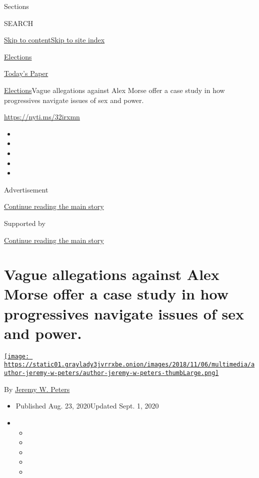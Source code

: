 Sections

SEARCH

\protect\hyperlink{site-content}{Skip to
content}\protect\hyperlink{site-index}{Skip to site index}

\href{https://www.nytimes3xbfgragh.onion/news-event/2020-election}{Elections}

\href{https://myaccount.nytimes3xbfgragh.onion/auth/login?response_type=cookie\&client_id=vi}{}

\href{https://www.nytimes3xbfgragh.onion/section/todayspaper}{Today's
Paper}

\href{/news-event/2020-election}{Elections}\textbar{}Vague allegations
against Alex Morse offer a case study in how progressives navigate
issues of sex and power.

\url{https://nyti.ms/32irxmn}

\begin{itemize}
\item
\item
\item
\item
\item
\end{itemize}

Advertisement

\protect\hyperlink{after-top}{Continue reading the main story}

Supported by

\protect\hyperlink{after-sponsor}{Continue reading the main story}

\hypertarget{vague-allegations-against-alex-morse-offer-a-case-study-in-how-progressives-navigate-issues-of-sex-and-power}{%
\section{Vague allegations against Alex Morse offer a case study in how
progressives navigate issues of sex and
power.}\label{vague-allegations-against-alex-morse-offer-a-case-study-in-how-progressives-navigate-issues-of-sex-and-power}}

\href{https://www.nytimes3xbfgragh.onion/by/jeremy-w-peters}{\texttt{[image: https://static01.graylady3jvrrxbe.onion/images/2018/11/06/multimedia/author-jeremy-w-peters/author-jeremy-w-peters-thumbLarge.png]}}

By \href{https://www.nytimes3xbfgragh.onion/by/jeremy-w-peters}{Jeremy
W. Peters}

\begin{itemize}
\item
  Published Aug. 23, 2020Updated Sept. 1, 2020
\item
  \begin{itemize}
  \item
  \item
  \item
  \item
  \item
  \end{itemize}
\end{itemize}

